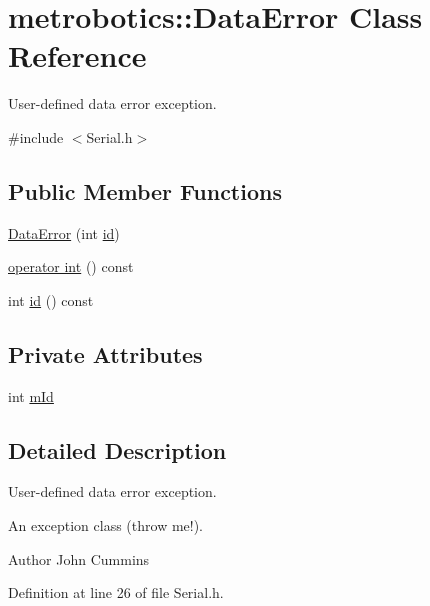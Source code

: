 \hypertarget{classmetrobotics_1_1DataError}{\section{metrobotics\-:\-:\-Data\-Error \-Class \-Reference}
\label{classmetrobotics_1_1DataError}
}


\-User-\/defined data error exception.  




{\ttfamily \#include $<$\-Serial.\-h$>$}

\subsection*{\-Public \-Member \-Functions}
\begin{DoxyCompactItemize}
\item 
\hyperlink{classmetrobotics_1_1DataError_a2cc1a75b7d9c444c9d77ebae6d7c6894}{\-Data\-Error} (int \hyperlink{classmetrobotics_1_1DataError_a1ea0d82459bfab29f6683a6cf82ff1a0}{id})
\item 
\hyperlink{classmetrobotics_1_1DataError_af2f7099ee20c2c7bf844cbdec7e50d07}{operator int} () const 
\item 
int \hyperlink{classmetrobotics_1_1DataError_a1ea0d82459bfab29f6683a6cf82ff1a0}{id} () const 
\end{DoxyCompactItemize}
\subsection*{\-Private \-Attributes}
\begin{DoxyCompactItemize}
\item 
int \hyperlink{classmetrobotics_1_1DataError_a2bb599c7e444359c76c5be1ae8acd8f5}{m\-Id}
\end{DoxyCompactItemize}


\subsection{\-Detailed \-Description}
\-User-\/defined data error exception. 

\-An exception class (throw me!). \begin{DoxyAuthor}{\-Author}
\-John \-Cummins 
\end{DoxyAuthor}


\-Definition at line 26 of file \-Serial.\-h.



